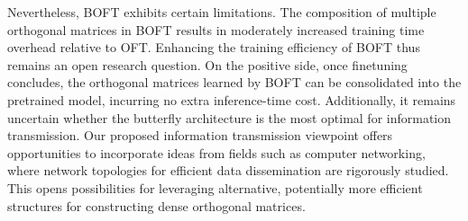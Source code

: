 Nevertheless, BOFT exhibits certain limitations. The composition of multiple orthogonal matrices in BOFT results in moderately increased training time overhead relative to OFT. Enhancing the training efficiency of BOFT thus remains an open research question. On the positive side, once finetuning concludes, the orthogonal matrices learned by BOFT can be consolidated into the pretrained model, incurring no extra inference-time cost. Additionally, it remains uncertain whether the butterfly architecture is the most optimal for information transmission. Our proposed information transmission viewpoint offers opportunities to incorporate ideas from fields such as computer networking, where network topologies for efficient data dissemination are rigorously studied. This opens possibilities for leveraging alternative, potentially more efficient structures for constructing dense orthogonal matrices.